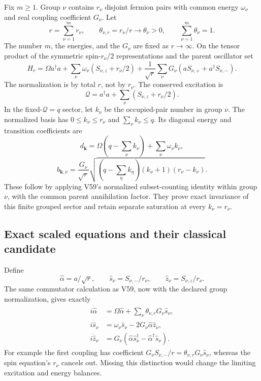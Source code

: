 \documentclass[11pt]{article}
\theoremstyle{remark}
\begin{document}
Fix \(m\geq1\).  Group \(\nu\) contains \(r_\nu\) disjoint
fermion pairs with common energy \(\omega_\nu\) and real
coupling coefficient \(G_\nu\).  Let
\[
 r=\sum_{\nu=1}^m r_\nu,\qquad
 \theta_{\nu,r}=r_\nu/r\longrightarrow\theta_\nu>0,
 \qquad\sum_{\nu=1}^m\theta_\nu=1 .
\]
The number \(m\), the energies, and the \(G_\nu\) are fixed
as \(r\to\infty\).  On the tensor product of the symmetric
spin-\(r_\nu/2\) representations and the parent oscillator set
\[
 H_r=\Omega a^\dagger a+
 \sum_\nu\omega_\nu(S_{\nu,z}+r_\nu/2)
 +\frac1{\sqrt r}\sum_\nu G_\nu
          (aS_{\nu,+}+a^\dagger S_{\nu,-}).
\]
The normalization is by total \(r\), not by \(r_\nu\).
The conserved excitation is
\[
 \mathcal Q=a^\dagger a+\sum_\nu(S_{\nu,z}+r_\nu/2).
\]
In the fixed-\(\mathcal Q=q\) sector, let \(k_\nu\) be
the occupied-pair number in group \(\nu\).
The normalized basis has
\(0\leq k_\nu\leq r_\nu\) and \(\sum_\nu k_\nu\leq q\).
Its diagonal energy and transition coefficients are
\[
 d_{\boldsymbol k}=\Omega(q-\sum_\nu k_\nu)
                            +\sum_\nu\omega_\nu k_\nu,
\]
\[
 b_{\boldsymbol k,\nu}=\frac{G_\nu}{\sqrt r}
 \sqrt{(q-\sum_\eta k_\eta)(k_\nu+1)(r_\nu-k_\nu)} .
\]
These follow by applying V59's normalized subset-counting
identity within group \(\nu\), with the common parent
annihilation factor.  They prove exact invariance of
this finite grouped sector and retain separate saturation
at every \(k_\nu=r_\nu\).

\subsection{Exact scaled equations and their classical candidate}

Define
\[
 \widehat\alpha=a/\sqrt r,\qquad
 \widehat s_\nu=S_{\nu,-}/r_\nu,\qquad
 \widehat z_\nu=S_{\nu,z}/r_\nu .
\]
The same commutator calculation as V59, now with the
declared group normalization, gives exactly
\[
 \begin{aligned}
 i\dot{\widehat\alpha}
    &=\Omega\widehat\alpha+
             \sum_\nu\theta_{\nu,r}G_\nu\widehat s_\nu,\\
 i\dot{\widehat s}_\nu
    &=\omega_\nu\widehat s_\nu
                         -2G_\nu\widehat\alpha\widehat z_\nu,\\
 i\dot{\widehat z}_\nu
    &=G_\nu(\widehat\alpha\widehat s_\nu^\dagger
                         -\widehat\alpha^\dagger\widehat s_\nu).
 \end{aligned}
\]
For example the first coupling has coefficient
\(G_\nu S_{\nu,-}/r=\theta_{\nu,r}G_\nu\widehat s_\nu\),
whereas the spin equation's \(r_\nu\) cancels out.
Missing this distinction would change the limiting
excitation and energy balances.
\end{document}
